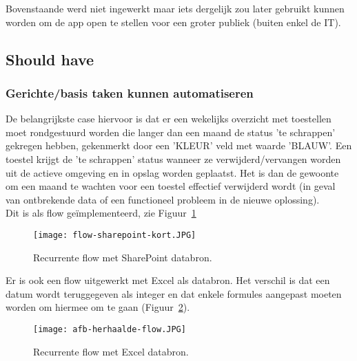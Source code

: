 Bovenstaande werd niet ingewerkt maar iets dergelijk zou later gebruikt kunnen worden om de app open te stellen voor een groter publiek (buiten enkel de IT).

\subsection{Should have}

\subsubsection{Gerichte/basis taken kunnen automatiseren}

De belangrijkste case hiervoor is dat er een wekelijks overzicht met toestellen moet rondgestuurd worden die langer dan een maand de status 'te schrappen' gekregen hebben, gekenmerkt door een 'KLEUR' veld met waarde 'BLAUW'. Een toestel krijgt de 'te schrappen' status wanneer ze verwijderd/vervangen worden uit de actieve omgeving en in opslag worden geplaatst. Het is dan de gewoonte om een maand te wachten voor een toestel effectief verwijderd wordt (in geval van ontbrekende data of een functioneel probleem in de nieuwe oplossing).\\
Dit is als flow geïmplementeerd, zie Figuur~\ref{fig:flow-sharepoint-kort}

\begin{figure}[h!]
    \centering
    \texttt{[image: flow-sharepoint-kort.JPG]}
    \caption{Recurrente flow met SharePoint databron.}
    \label{fig:flow-sharepoint-kort}
\end{figure}

Er is ook een flow uitgewerkt met Excel als databron. Het verschil is dat een datum wordt teruggegeven als integer en dat enkele formules aangepast moeten worden om hiermee om te gaan (Figuur~\ref{fig:recurrent-flow-excel}). 

\begin{figure}[h!]
    \centering
    \texttt{[image: afb-herhaalde-flow.JPG]}
    \caption{Recurrente flow met Excel databron.}
    \label{fig:recurrent-flow-excel}
\end{figure}

